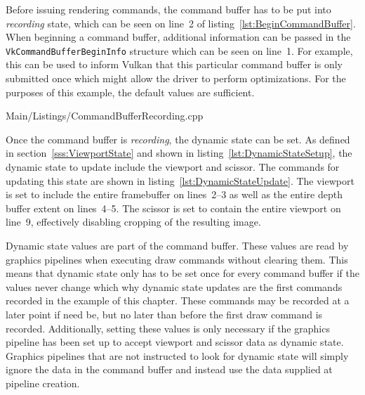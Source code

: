       Before issuing rendering commands, the command buffer has to be put into \textit{recording} state, which can be seen on line~2 of listing~\ref{lst:BeginCommandBuffer}.
      When beginning a command buffer, additional information can be passed in the \lstinline{VkCommandBufferBeginInfo} structure which can be seen on line~1.
      For example, this can be used to inform Vulkan that this particular command buffer is only submitted once which might allow the \gls{driver} to perform optimizations.
      For the purposes of this example, the default values are sufficient.

      
      {Main/Listings/CommandBufferRecording.cpp}

      Once the command buffer is \textit{recording}, the dynamic state can be set.
      As defined in section~\ref{sss:ViewportState} and shown in listing~\ref{lst:DynamicStateSetup}, the dynamic state to update include the viewport and scissor.
      The commands for updating this state are shown in listing~\ref{lst:DynamicStateUpdate}.
      The viewport is set to include the entire framebuffer on lines~2--3 as well as the entire depth buffer extent on lines~4--5.
      The scissor is set to contain the entire viewport on line~9, effectively disabling cropping of the resulting image.

      Dynamic state values are part of the command buffer.
      These values are read by graphics pipelines when executing draw commands without clearing them.
      This means that dynamic state only has to be set once for every command buffer if the values never change which why dynamic state updates are the first commands recorded in the example of this chapter.
      These commands may be recorded at a later point if need be, but no later than before the first draw command is recorded.
      Additionally, setting these values is only necessary if the graphics pipeline has been set up to accept viewport and scissor data as dynamic state.
      Graphics pipelines that are not instructed to look for dynamic state will simply ignore the data in the command buffer and instead use the data supplied at pipeline creation.

